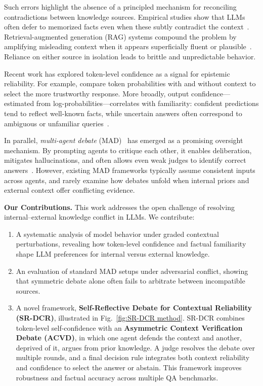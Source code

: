 \documentclass[11pt]{article}
\begin{document}
Such errors highlight the absence of a principled mechanism for reconciling contradictions between knowledge sources. Empirical studies show that LLMs often defer to memorized facts even when these subtly contradict the context~\citep{brown2020language,longpre2021entity}. Retrieval-augmented generation (RAG) systems compound the problem by amplifying misleading context when it appears superficially fluent or plausible~\citep{niu2023ragtruth}. Reliance on either source in isolation leads to brittle and unpredictable behavior.

Recent work has explored token-level confidence as a signal for epistemic reliability. For example, \citet{wu2024clasheval} compare token probabilities with and without context to select the more trustworthy response. More broadly, output confidence---estimated from log-probabilities---correlates with familiarity: confident predictions tend to reflect well-known facts, while uncertain answers often correspond to ambiguous or unfamiliar queries~\citep{wang2022self}.

In parallel, \textit{multi-agent debate} (MAD)~\citep{du2023improving,chan2023chateval,liang2023encouraging,kenton2024scalable,lang2025debate,agarwal2025when} has emerged as a promising oversight mechanism. By prompting agents to critique each other, it enables deliberation, mitigates hallucinations, and often allows even weak judges to identify correct answers~\citep{irving2018ai,michael2023debate}. However, existing MAD frameworks typically assume consistent inputs across agents, and rarely examine how debates unfold when internal priors and external context offer conflicting evidence.

\vspace{0.5em}
\noindent\textbf{Our Contributions.}  
This work addresses the open challenge of resolving internal–external knowledge conflict in LLMs. We contribute:
\begin{enumerate}[leftmargin=*, itemsep=2pt]
    \item A systematic analysis of model behavior under graded contextual perturbations, revealing how token-level confidence and factual familiarity shape LLM preferences for internal versus external knowledge.
    \item An evaluation of standard MAD setups under adversarial conflict, showing that symmetric debate alone often fails to arbitrate between incompatible sources.
    \item A novel framework, \textbf{Self-Reflective Debate for Contextual Reliability (SR-DCR)}, illustrated in Fig.~\ref{fig:SR-DCR method}. SR-DCR combines token-level self-confidence with an \textbf{Asymmetric Context Verification Debate (ACVD)}, in which one agent defends the context and another, deprived of it, argues from prior knowledge. A judge resolves the debate over multiple rounds, and a final decision rule integrates both context reliability and confidence to select the answer or abstain. This framework improves robustness and factual accuracy across multiple QA benchmarks.
\end{enumerate}
\end{document}
